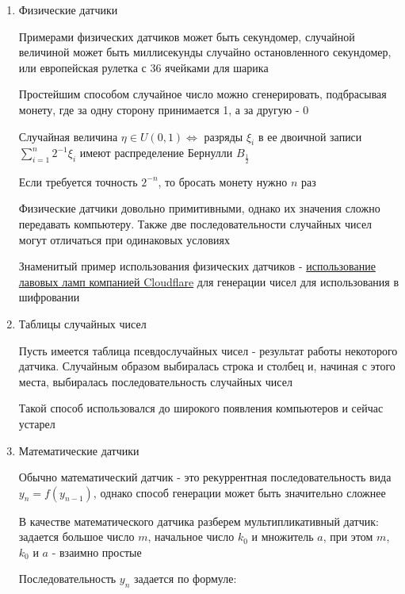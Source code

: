 \documentclass[12pt]{article}
\begin{document}
\begin{enumerate}[label*=\Roman*. ]
    \item Физические датчики

    Примерами физических датчиков может быть секундомер, случайной величиной может быть миллисекунды случайно остановленного секундомер, или европейская рулетка с 36 ячейками для шарика

    Простейшим способом случайное число можно сгенерировать, подбрасывая монету, где за одну сторону принимается 1, а за другую - 0

    \begin{MyTheorem}
        \Ths Случайная величина $\eta \in U(0, 1) \Longleftrightarrow$ разряды $\xi_i$ в ее двоичной записи $\sum_{i = 1}^n 2^{-1} \xi_i$ имеют распределение Бернулли $B_{\frac{1}{2}}$
    \end{MyTheorem}

    Если требуется точность $2^{-n}$, то бросать монету нужно $n$ раз 

    Физические датчики довольно примитивными, однако их значения сложно передавать компьютеру. Также две последовательности случайных чисел могут отличаться при одинаковых условиях

    Знаменитый пример использования физических датчиков - \href{https://www.cloudflare.com/learning/ssl/lava-lamp-encryption/}{использование лавовых ламп компанией Cloudflare} для генерации чисел для использования в шифровании

    \item Таблицы случайных чисел

    Пусть имеется таблица псевдослучайных чисел - результат работы некоторого датчика. Случайным образом выбиралась строка и столбец и, начиная с этого места, выбиралась последовательность случайных чисел

    Такой способ использовался до широкого появления компьютеров и сейчас устарел

    \item Математические датчики

    Обычно математический датчик - это рекуррентная последовательность вида $y_n = f(y_{n - 1})$, однако способ генерации может быть значительно сложнее

    В качестве математического датчика разберем мультипликативный датчик: задается большое число $m$, начальное число $k_0$ и множитель $a$, при этом $m$, $k_0$ и $a$ - взаимно простые

    Последовательность $y_n$ задается по формуле:


\end{enumerate}
\end{document}
